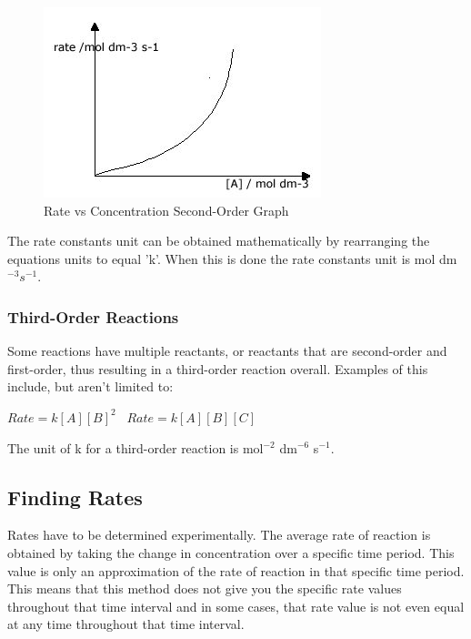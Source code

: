 \begin{figure}[H]
    \includegraphics[width=\textwidth]{./Planning/Images/SecondOrder.jpg}
    \caption{ Rate vs Concentration Second-Order Graph} \label{fig:Second Order Graph}
\end{figure}

The rate constants unit can be obtained mathematically by rearranging the equations units to equal 'k'. When this is done the rate constants unit is mol dm$^{-3} s^{-1}$.

\subsubsection{Third-Order Reactions}

Some reactions have multiple reactants, or reactants that are second-order and first-order, thus resulting in a third-order reaction overall. Examples of this include, but aren't limited to:

$Rate = k [A] [B]^2$ \ 
$Rate = k [A] [B] [C]$

The unit of k for a third-order reaction is mol$^{-2}$ dm$^{-6}$ s$^{-1}$.







	\subsection{Finding Rates}


Rates have to be determined experimentally. The average rate of reaction is obtained by taking the change in concentration over a specific time period. This value is only an approximation of the rate of reaction in that specific time period. This means that this method does not give you the specific rate values throughout that time interval and in some cases, that rate value is not even equal at any time throughout that time interval.

